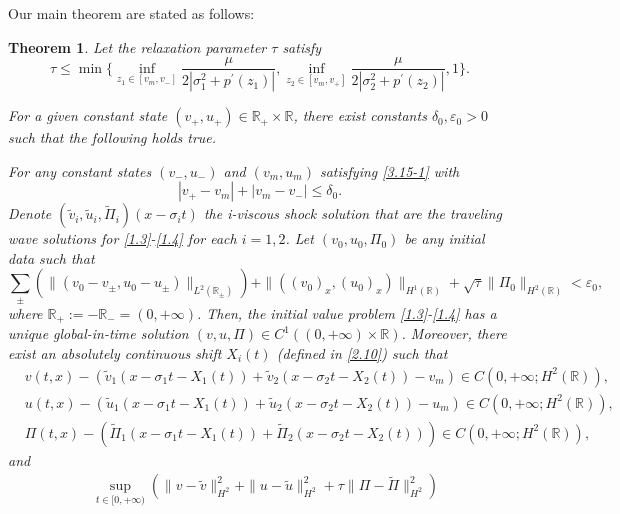 \documentclass[10pt,reqno]{amsart}
\numberwithin{equation}{section}
\newtheorem{theorem}{Theorem}[section]
\begin{document}
Our main theorem are stated as follows:

\begin{theorem}\label{th1}
Let the relaxation parameter $\tau$ satisfy
\begin{equation}\label{2.5}
\tau\leq \min\{\inf\limits_{z_1\in[v_m,v_-]}\frac{\mu}{2|\sigma_1^2+p^{\prime}(z_1)|},
\inf\limits_{z_2\in[v_m,v_+]}\frac{\mu}{2|\sigma_2^2+p^{\prime}(z_2)|},
1\}.
\end{equation}

For a given constant state $(v_+,u_+)\in \mathbb{R}_+\times \mathbb{R}$,
there exist constants $\delta_0,\varepsilon_0>0$ such that the following holds true.

For any constant states $(v_-,u_-)$ and $(v_m,u_m)$ satisfying \eqref{3.15-1} with
\[|v_+-v_m|+|v_m-v_-|\leq\delta_0.\]
Denote $(\widetilde{v}_i,\widetilde{u}_i,\widetilde{\Pi}_i)(x-\sigma_i t)$ the i-viscous shock solution that are the traveling wave solutions for \eqref{1.3}-\eqref{1.4} for each $i=1,2$.
Let $(v_0,u_0,\Pi_0)$ be any initial data such that
\begin{equation}\label{1.8}
\sum\limits_{\pm}\left(\|(v_0-v_{\pm},u_0-u_{\pm})\|_{L^2(\mathbb{R}_{\pm})}\right)
+\|((v_0)_x,(u_0)_x)\|_{H^1(\mathbb{R})}+\sqrt{\tau}\|\Pi_0\|_{H^2(\mathbb{R})}<\varepsilon_0,
\end{equation}
where $\mathbb{R}_+:=-\mathbb{R}_-=(0,+\infty)$.
Then, the initial value problem \eqref{1.3}-\eqref{1.4} has a unique global-in-time solution $(v,u,\Pi)\in C^1((0, +\infty)\times \mathbb R)$. Moreover, there exist an absolutely continuous shift $X_i(t)$ (defined in \eqref{2.10}) such that
\begin{equation}\label{1.9}
\begin{aligned}
&v(t,x)-\left(\widetilde{v}_1(x-\sigma_1 t-X_1(t))+\widetilde{v}_2(x-\sigma_2 t-X_2(t))-v_m\right)\in C(0,+\infty;H^2(\mathbb{R})),\\
&u(t,x)-\left(\widetilde{u}_1(x-\sigma_1 t-X_1(t))+\widetilde{u}_2(x-\sigma_2 t-X_2(t))-u_m\right)\in C(0,+\infty;H^2(\mathbb{R})),\\
&\Pi(t,x)-\left(\widetilde{\Pi}_1(x-\sigma_1 t-X_1(t))+\widetilde{\Pi}_2(x-\sigma_2 t-X_2(t))\right)\in C(0,+\infty;H^2(\mathbb{R})),
\end{aligned}
\end{equation}
and
\begin{equation}\label{hu1}
\begin{aligned}
&\sup\limits_{t\in[0,+\infty)}\left(\|v-\widetilde{v}\|^2_{H^2}
+\|u-\widetilde{u}\|^2_{H^2}+\tau\|\Pi-\widetilde{\Pi}\|^2_{H^2}\right)\\

\end{aligned}
\end{equation}
\end{theorem}
\end{document}
